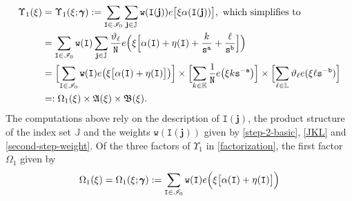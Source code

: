 \documentclass[12pt, twoside]{article}
\theoremstyle{definition}
\numberwithin{equation}{section}
\begin{document}
\begin{align} 
 \Upsilon_1(\xi) &= \Upsilon_1(\xi; \pmb{\gamma}) :=  \sum_{\mathtt I \in \mathscr{I}_0} \sum_{\mathbf j \in \mathbb J} \mathtt w(\mathtt I(\mathbf j)) e\bigl[\xi \alpha(\mathtt I(\mathbf j)) \bigr], \text{ which simplifies to }  \label{Y-0} \\
 &=  \sum_{\mathtt I \in \mathscr{I}_0} \mathtt w(\mathtt I) \sum_{\mathbf j \in \mathbb J} \frac{\vartheta_{\ell}}{\mathtt N} e\Bigl(\xi \Bigl[ \alpha(\mathtt I) + \eta(\mathtt I) + \frac{k}{\mathtt s^{\mathtt a}} + \frac{\ell}{\mathtt s^{\mathtt b}} \Bigr]\Bigr) \nonumber \\
 &=  \Bigl[\sum_{\mathtt I \in \mathscr{I}_0} \mathtt w(\mathtt I) e \bigl(\xi \bigl[ \alpha(\mathtt I) + \eta(\mathtt I) \bigr] \bigr) \Bigr] \times \Bigl[\sum_{k \in \mathbb K} \frac{1}{\mathtt N} e \bigl(\xi k \mathtt s^{-\mathtt a} \bigr) \Bigr] \times \Bigl[ \sum_{\ell \in \mathbb L} \vartheta_{\ell} e(\xi \ell \mathtt s^{-\mathtt b}) \Bigr]
  \label{Y} \\
  &=:  \Omega_1(\xi) \times \mathfrak A(\xi) \times \mathfrak B(\xi). \label{factorization} 
\end{align}
The computations above rely on the description of $\mathtt I(\mathbf j)$, the product structure of the index set $\mathbb J$ and the weights $\mathtt w(\mathtt I(\mathbf j))$ given by \eqref{step-2-basic}, \eqref{JKL} and \eqref{second-step-weight}. Of the three factors of $\Upsilon_1$ in \eqref{factorization}, 
the first factor $\Omega_1$ given by
\begin{equation} \label{Omega_1} 
\Omega_1(\xi) = \Omega_1(\xi; \pmb{\gamma}) := \sum_{\mathtt I \in \mathscr{I}_0} \mathtt w(\mathtt I)  e \Bigl(\xi \bigl[\alpha(\mathtt I) + \eta(\mathtt I) \bigr]\Bigr) 
\end{equation} 
\end{document}
